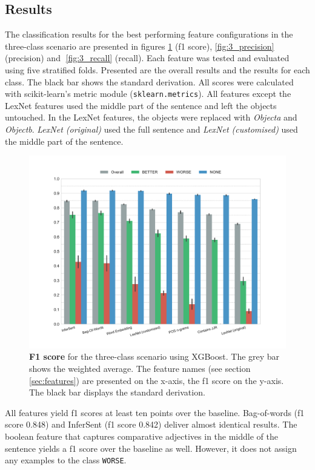 \subsection{Results}
\label{sec:3_results}
The classification results for the best performing feature configurations in the three-class scenario are presented in figures \ref{fig:3_f1} (f1 score), \ref{fig:3_precision} (precision) and \ref{fig:3_recall} (recall). Each feature was tested and evaluated using five stratified folds. Presented are the overall results and the results for each class. The black bar shows the standard derivation. All scores were calculated with scikit-learn's metric module (\texttt{sklearn.metrics}). All features except the LexNet features used the middle part of the sentence and left the objects untouched. In the LexNet features, the objects were replaced with \emph{Objecta} and \emph{Objectb}. \emph{LexNet (original)} used the full sentence and \emph{LexNet (customised)} used the middle part of the sentence. 

\begin{figure}[htbp]
      \caption{\textbf{F1 score} for the three-class scenario using XGBoost. The grey bar shows the weighted average. The feature names (see section \ref{sec:features}) are presented on the x-axis, the f1 score on the y-axis. The black bar displays the standard derivation.} 
    \label{fig:3_f1}
 \centering
	\includegraphics[width=1\textwidth]{images/experiments/f1-False}

\end{figure}


All features yield f1 scores at least ten points over the baseline. Bag-of-words (f1 score 0.848) and InferSent (f1 score 0.842) deliver almost identical results. The boolean feature that captures comparative adjectives in the middle of the sentence yields a f1 score over the baseline as well. However, it does not assign any examples to the class \texttt{WORSE}.

